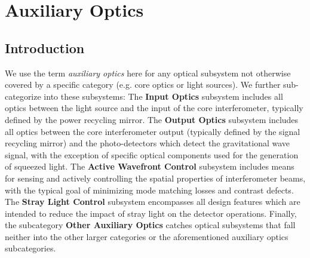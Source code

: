\chapter{Auxiliary Optics}
\label{sec:Aux-optics}


\section{Introduction}
We use the term \emph{auxiliary optics} here for any optical subsystem not otherwise covered by a specific category (e.g. core optics or light sources). We further sub-categorize into these subsystems:
The {\bf Input Optics} subsystem includes all optics between the light source and the input of the core interferometer, typically defined by the power recycling mirror. The {\bf Output Optics} subsystem includes all optics between the core interferometer output (typically defined by the signal recycling mirror) and the photo-detectors which detect the gravitational wave signal, with the exception of specific optical components used for the generation of squeezed light. The {\bf Active Wavefront Control} subsystem includes means for sensing and actively controlling the spatial properties of interferometer beams, with the typical goal of minimizing mode matching losses and contrast defects. The {\bf Stray Light Control} subsystem encompasses all design features which are intended to reduce the impact of stray light on the detector operations. Finally, the subcategory {\bf Other Auxiliary Optics} catches optical subsystems that fall neither into the other larger categories or the aforementioned auxiliary optics subcategories.

